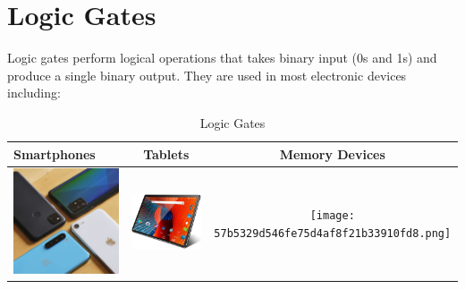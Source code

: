 \documentclass{article}
\begin{document}
	\section{Logic Gates}
	Logic gates perform logical operations that takes binary input (0s and 1s) and produce a single binary output.
	They are used in most electronic devices including:
	\begin{table}[h!]
		\begin{center}
			\caption{Logic Gates}
			\label{tab:Table 1}
			\begin{tabular}{|l|c|c|}
				\hline
				Smartphones
				&
				Tablets & Memory Devices\\
				\hline
				\includegraphics[width=0.2\linewidth]{vpavic_200805_4131_0086_1.jpg}
				&
				\includegraphics[width=0.25\linewidth]{productimg.jpeg}
				&
				\texttt{[image: 57b5329d546fe75d4af8f21b33910fd8.png]}\\
				\hline
			\end{tabular}
				
		\end{center}
		
		
	\end{table}
	
\end{document}
